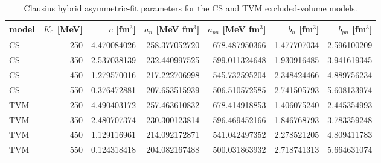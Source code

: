\begin{table}[ht]
\centering
\caption{Clausius hybrid asymmetric-fit parameters for the CS and TVM excluded-volume models.}
\begin{tabular}{l r r r r r r}
\hline
model & $K_0$ [MeV] & $c$ [fm$^3$] & $a_n$ [MeV fm$^3$] & $a_{pn}$ [MeV fm$^3$] & $b_n$ [fm$^3$] & $b_{pn}$ [fm$^3$] \\
\hline
CS & 250 & 4.470084026 & 258.377052720 & 678.487950366 & 1.477707034 & 2.596100209 \\
CS & 350 & 2.537038139 & 232.440997525 & 599.011324648 & 1.930916485 & 3.941619345 \\
CS & 450 & 1.279570016 & 217.222706998 & 545.732595204 & 2.348424466 & 4.889756234 \\
CS & 550 & 0.376472881 & 207.653515939 & 506.510572585 & 2.741505793 & 5.608133974 \\
TVM & 250 & 4.490403172 & 257.463610832 & 678.414918853 & 1.406075240 & 2.445354993 \\
TVM & 350 & 2.480707374 & 230.300123814 & 596.469452166 & 1.846768793 & 3.783359248 \\
TVM & 450 & 1.129116961 & 214.092172871 & 541.042497352 & 2.278521205 & 4.809411783 \\
TVM & 550 & 0.124318418 & 204.082167488 & 500.031863932 & 2.718741313 & 5.664631074 \\
\hline
\end{tabular}
\end{table}
